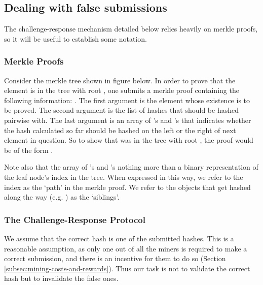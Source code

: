 \subsection{Dealing with false submissions}\label{sec:challengeresponse}
The challenge-response mechanism detailed below relies heavily on merkle proofs, so it will be useful to establish some notation.

\subsubsection{Merkle Proofs}
Consider the merkle tree shown in figure below. In order to prove that the element  is in the tree with root , one submits a merkle proof containing the following information: . The first argument is the element whose existence is to be proved. The second argument is the list of hashes that  should be hashed pairwise with. The last argument is an array of 's and 's that indicates whether the hash calculated so far should be hashed on the left or the right of next element in question. So to show that  was in the tree with root , the proof would be of the form .
\begin{center}
\end{center}
Note also that the array of 's and 's nothing more than a binary representation of the leaf node's index in the tree. When expressed in this way, we refer to the index as the `path' in the merkle proof. We refer to the objects that get hashed along the way (e.g. \ascode{[D,E]}) as the `siblings'.
%
\subsubsection{The Challenge-Response Protocol}
We assume that the correct hash is one of the  submitted hashes. This is a reasonable assumption, as only one out of all the miners is required to make a correct submission, and there is an incentive for them to do so (Section \ref{subsec:mining-costs-and-rewards}). Thus our task is not to validate the correct hash but to invalidate the false ones.

